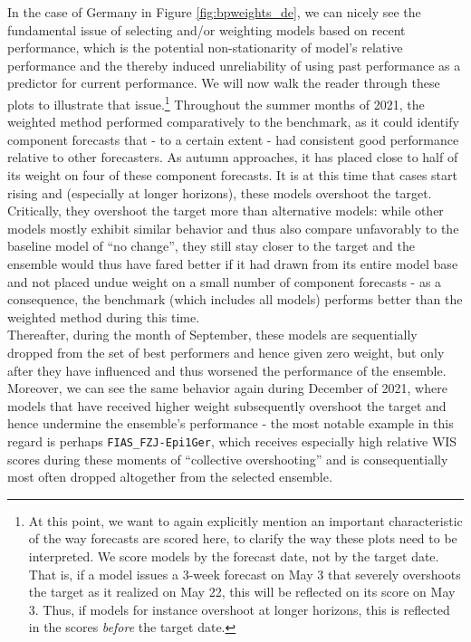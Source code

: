 In the case of Germany in Figure \ref{fig:bpweights_de}, we can nicely see the fundamental issue of selecting and/or weighting models based on recent performance, which is the potential non-stationarity of model's relative performance and the thereby induced unreliability of using past performance as a predictor for current performance. We will now walk the reader through these plots to illustrate that issue.\footnote{At this point, we want to again explicitly mention an important characteristic of the way forecasts are scored here, to clarify the way these plots need to be interpreted. We score models by the forecast date, not by the target date. That is, if a model issues a 3-week forecast on May 3 that severely overshoots the target as it realized on May 22, this will be reflected on its score on May 3. Thus, if models for instance overshoot at longer horizons, this is reflected in the scores \textit{before} the target date.} Throughout the summer months of 2021, the weighted method performed comparatively to the benchmark, as it could identify component forecasts that - to a certain extent - had consistent good performance relative to other forecasters. As autumn approaches, it has placed close to half of its weight on four of these component forecasts. It is at this time that cases start rising and (especially at longer horizons), these models overshoot the target. Critically, they overshoot the target more than alternative models: while other models mostly exhibit similar behavior and thus also compare unfavorably to the baseline model of ``no change'', they still stay closer to the target and the ensemble would thus have fared better if it had drawn from its entire model base and not placed undue weight on a small number of component forecasts - as a consequence, the benchmark (which includes all models) performs better than the weighted method during this time.\\ 
Thereafter, during the month of September, these models are sequentially dropped from the set of best performers and hence given zero weight, but only after they have influenced and thus worsened the performance of the ensemble. Moreover, we can see the same behavior again during December of 2021, where models that have received higher weight subsequently overshoot the target and hence undermine the ensemble's performance - the most notable example in this regard is perhaps \texttt{FIAS\_FZJ-Epi1Ger}, which receives especially high relative WIS scores during these moments of ``collective overshooting'' and is consequentially most often dropped altogether from the selected ensemble.\\ 
